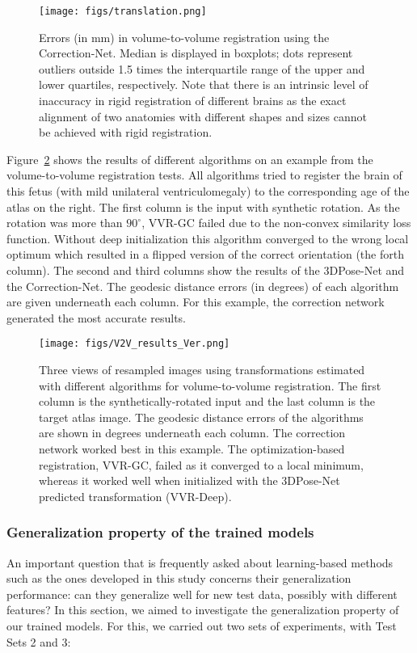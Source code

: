 \documentclass[journal,transmag]{IEEEtran}
\begin{document}
\begin{figure}
    \centering
    \texttt{[image: figs/translation.png]}
    \caption{Errors (in mm) in volume-to-volume registration using the Correction-Net. Median is displayed in boxplots; dots represent outliers outside 1.5 times the interquartile range of the upper and lower quartiles, respectively. Note that there is an intrinsic level of inaccuracy in rigid registration of different brains as the exact alignment of two anatomies with different shapes and sizes cannot be achieved with rigid registration.}%
    \label{fig:translation}
\end{figure}

Figure~\ref{fig:3DVis} shows the results of different algorithms on an example from the volume-to-volume registration tests. All algorithms tried to register the brain of this fetus (with mild unilateral ventriculomegaly) to the corresponding age of the atlas on the right. The first column is the input with synthetic rotation. As the rotation was more than $90^\circ$, VVR-GC failed due to the non-convex similarity loss function. Without deep initialization this algorithm converged to the wrong local optimum which resulted in a flipped version of the correct orientation (the forth column). The second and third columns show the results of the 3DPose-Net and the Correction-Net. The geodesic distance errors (in degrees) of each algorithm are given underneath each column. For this example, the correction network generated the most accurate results. 

\begin{figure}
    \centering
    \texttt{[image: figs/V2V\_results\_Ver.png]}
    \caption{Three views of resampled images using transformations estimated with different algorithms for volume-to-volume registration. The first column is the synthetically-rotated input and the last column is the target atlas image. The geodesic distance errors of the algorithms are shown in degrees underneath each column. The correction network worked best in this example. The optimization-based registration, VVR-GC, failed as it converged to a local minimum, whereas it worked well when initialized with the 3DPose-Net predicted transformation (VVR-Deep).}
    \label{fig:3DVis}
\end{figure}

\subsubsection{Generalization property of the trained models}
An important question that is frequently asked about learning-based methods such as the ones developed in this study concerns their generalization performance: can they generalize well for new test data, possibly with different features? In this section, we aimed to investigate the generalization property of our trained models. For this, we carried out two sets of experiments, with Test Sets 2 and 3:
\end{document}
